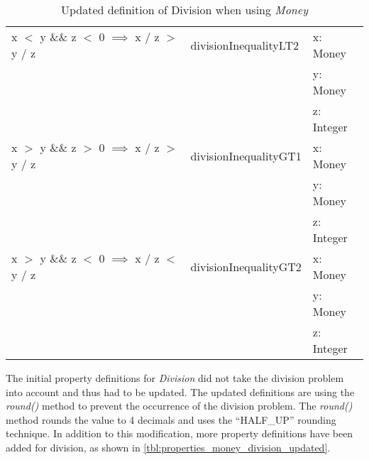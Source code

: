 \begin{table}[!ht]
\begin{tabular}{lll}
\rowcolor[HTML]{EFEFEF} x $<$ y \&\& z $<$ 0 $\implies$ x / z $>$ y / z              & divisionInequalityLT2  & x: Money                 \\
\rowcolor[HTML]{EFEFEF}                                                              &                        & y: Money                 \\
\rowcolor[HTML]{EFEFEF}                                                              &                        & z: Integer               \\
												x $>$ y \&\& z $>$ 0 $\implies$ x / z $>$ y / z              & divisionInequalityGT1  & x: Money                 \\
                                                                                     &                        & y: Money                 \\
                                                                                     &                        & z: Integer               \\
\rowcolor[HTML]{EFEFEF} x $>$ y \&\& z $<$ 0 $\implies$ x / z $<$ y / z              & divisionInequalityGT2  & x: Money                 \\
\rowcolor[HTML]{EFEFEF}                                                              &                        & y: Money                 \\
\rowcolor[HTML]{EFEFEF}                                                              &                        & z: Integer               \\ \hline
\end{tabular}
\caption{Updated definition of Division when using \textit{Money}}
\label{tbl:properties_money_division_updated}
\end{table}
\FloatBarrier
The initial property definitions for \textit{Division} did not take the division
problem into account and thus had to be updated. The updated definitions are
using the \textit{round()} method to prevent the occurrence of the division
problem. The \textit{round()} method rounds the value to 4 decimals and uses the
``HALF\_UP'' rounding technique. In addition to this modification, more property
definitions have been added for division, as shown in
\autoref{tbl:properties_money_division_updated}.

